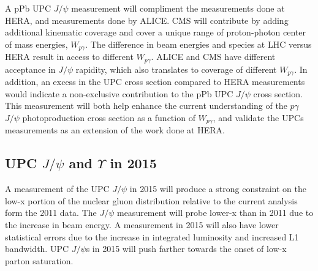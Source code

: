       A pPb UPC $J/\psi$ measurement will compliment the measurements done at 
        HERA, and measurements done by ALICE.
      CMS will contribute by adding additional kinematic coverage and cover a 
        unique range of proton-photon center of mass energies, $W_{p\gamma}$. 
      The difference in beam energies and species at LHC versus HERA result in
        access to different $W_{p\gamma}$. 
      ALICE and CMS have different acceptance in $J/\psi$ rapidity, which also 
        translates to coverage of different $W_{p\gamma}$.
      In addition, an excess in the UPC cross section compared to HERA 
        measurements would indicate a non-exclusive contribution to the pPb UPC 
        $J/\psi$ cross section. 
      This measurement will both help enhance the current understanding of 
        the $p\gamma$ $J/\psi$ photoproduction cross section as a function of 
        $W_{p\gamma}$, and validate the UPCs measurements as an extension of 
        the work done at HERA.

    \subsection{UPC $J/\psi$ and $\Upsilon$ in 2015}
      A measurement of the UPC $J/\psi$ in 2015 will produce a strong constraint
        on the low-x portion of the nuclear gluon distribution relative to 
        the current analysis form the 2011 data. 
      The $J/\psi$ measurement will probe lower-x than in 2011 due to the 
        increase in beam energy. 
      A measurement in 2015 will also have lower statistical errors due to the 
        increase in integrated luminosity and increased L1 bandwidth.
      UPC $J/\psi$s in 2015 will push farther towards the onset of low-x parton 
        saturation.

